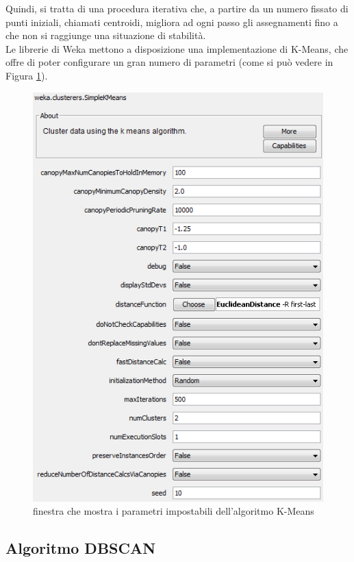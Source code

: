         Quindi, si tratta di una procedura iterativa che, a partire da un numero fissato di punti iniziali, chiamati centroidi, migliora ad ogni passo gli assegnamenti fino a che non si raggiunge una situazione di stabilità. \\

        Le librerie di Weka mettono a disposizione una implementazione di K-Means, che offre di poter configurare un gran numero di parametri (come si può vedere in Figura \ref{kmeans_weka}).

        \begin{figure}
            \centering
            \caption{finestra che mostra i parametri impostabili dell'algoritmo K-Means}
            \label{kmeans_weka}
            \includegraphics[scale=0.80]{img/cluster_k_means.png}
        \end{figure}

    \subsection{Algoritmo DBSCAN}

